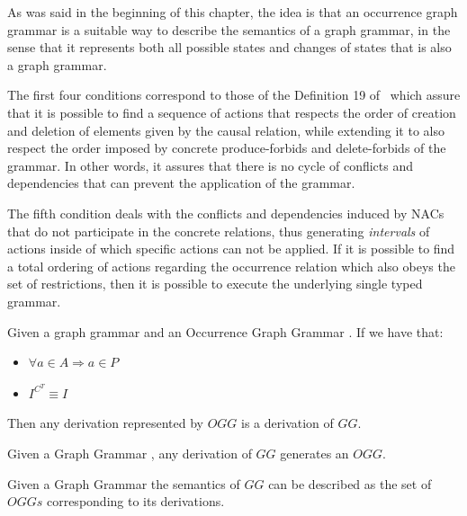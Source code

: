 As was said in the beginning of this chapter, the idea is that an occurrence graph grammar is a suitable way to describe the semantics of a graph grammar, in the sense that it represents both all possible states and changes of states that is also a graph grammar.

The first four conditions correspond to those of the Definition 19 of~\cite{Corradini1996} which assure that it is possible to find a sequence of actions that respects the order of creation and deletion of elements given by the causal relation, while extending it to also respect the order imposed by concrete produce-forbids and delete-forbids of the grammar. In other words, it assures that there is no cycle of conflicts and dependencies that can prevent the application of the grammar.

The fifth condition deals with the conflicts and dependencies induced by NACs that do not participate in the concrete relations, thus generating \emph{intervals} of actions inside of which specific actions can not be applied. If it is possible to find a total ordering of actions regarding the occurrence relation which also obeys the set of restrictions, then it is possible to execute the underlying single typed grammar.

\begin{thm} Given a graph grammar \graphGrammar{} and an Occurrence Graph Grammar \occurrenceGrammar{}. If we have that:
\begin{itemize}
  \item $\forall a \in A \Rightarrow a \in P$
  \item $I^{C^T} \equiv I$
\end{itemize}

Then any derivation represented by $OGG$ is a derivation of $GG$.

\end{thm}

\begin{definition}
\end{definition}

\begin{thm} Given a Graph Grammar \graphGrammar{}, any derivation of $GG$ generates an $OGG$. 
\end{thm}

\begin{definition} Given a Graph Grammar \graphGrammar{} the semantics of $GG$ can be described as the set of $OGGs$ corresponding to its derivations.
\end{definition}
